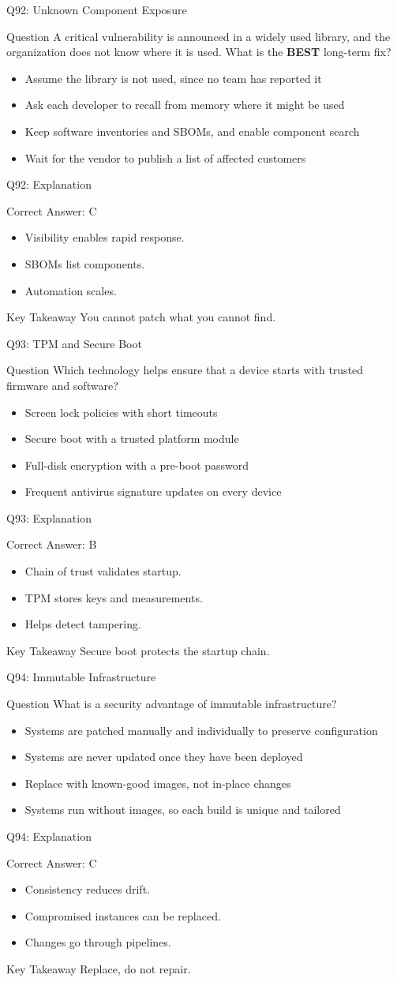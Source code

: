 \documentclass[aspectratio=169]{beamer}
\newcommand{\hq}[7]{%
	\begin{frame}{Q#1: #2}
		\begin{block}{Question}
			#3
		\end{block}
		\begin{itemize}
			#4
		\end{itemize}
	\end{frame}
	\begin{frame}{Q#1: Explanation}
		\begin{block}{Correct Answer: #5}
			\begin{itemize}
				#6
			\end{itemize}
		\end{block}
		\begin{alertblock}{Key Takeaway}
			#7
		\end{alertblock}
	\end{frame}
}
\begin{document}
	\hq{92}{Unknown Component Exposure}
	{A critical vulnerability is announced in a widely used library, and the organization does not know where it is used. What is the \textbf{BEST} long-term fix?}
	{\item[\textbf{(A)}] Assume the library is not used, since no team has reported it
		\item[\textbf{(B)}] Ask each developer to recall from memory where it might be used
		\item[\textbf{(C)}] Keep software inventories and SBOMs, and enable component search
		\item[\textbf{(D)}] Wait for the vendor to publish a list of affected customers}
	{C}
	{\item Visibility enables rapid response.
		\item SBOMs list components.
		\item Automation scales.}
	{You cannot patch what you cannot find.}

	\hq{93}{TPM and Secure Boot}
	{Which technology helps ensure that a device starts with trusted firmware and software?}
	{\item[\textbf{(A)}] Screen lock policies with short timeouts
		\item[\textbf{(B)}] Secure boot with a trusted platform module
		\item[\textbf{(C)}] Full-disk encryption with a pre-boot password
		\item[\textbf{(D)}] Frequent antivirus signature updates on every device}
	{B}
	{\item Chain of trust validates startup.
		\item TPM stores keys and measurements.
		\item Helps detect tampering.}
	{Secure boot protects the startup chain.}

	\hq{94}{Immutable Infrastructure}
	{What is a security advantage of immutable infrastructure?}
	{\item[\textbf{(A)}] Systems are patched manually and individually to preserve configuration
		\item[\textbf{(B)}] Systems are never updated once they have been deployed
		\item[\textbf{(C)}] Replace with known-good images, not in-place changes
		\item[\textbf{(D)}] Systems run without images, so each build is unique and tailored}
	{C}
	{\item Consistency reduces drift.
		\item Compromised instances can be replaced.
		\item Changes go through pipelines.}
	{Replace, do not repair.}
\end{document}
